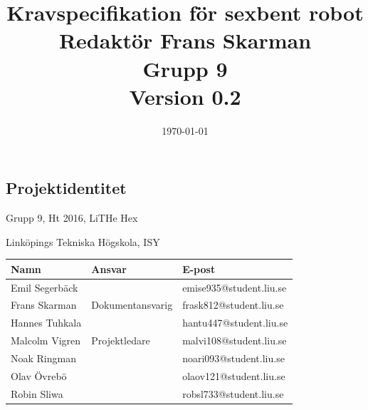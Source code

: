 \documentclass[a4paper,titlepage,12pt]{article}
\begin{document}
    \title{\LARGE
        \textbf{Kravspecifikation för sexbent robot} \\
        \vspace*{0.5\baselineskip}
        \large
        Redaktör Frans Skarman \\
        Grupp 9 \\
        \small
        \vspace*{0.5\baselineskip}
        Version 0.2}

    \date{\today}

	\maketitle
	\newpage

	
	\begin{center}


		\section*{Projektidentitet}
		Grupp 9, Ht 2016, LiTHe Hex

		Linköpings Tekniska Högskola, ISY

		\begin{table}[h]
			\begin{center}
				\begin{tabular}[pos]{ l l l }
					\textbf{Namn} & \textbf{Ansvar} & \textbf{E-post} \\ \midrule
					Emil Segerbäck & & emise935@student.liu.se \\ \midrule
					Frans Skarman & Dokumentansvarig & frask812@student.liu.se \\ \midrule
					Hannes Tuhkala & & hantu447@student.liu.se \\ \midrule
					Malcolm Vigren & Projektledare & malvi108@student.liu.se \\ \midrule
					Noak Ringman &  & noari093@student.liu.se \\ \midrule
					Olav Övrebö &  & olaov121@student.liu.se \\ \midrule
					Robin Sliwa &  & robsl733@student.liu.se \\
				\end{tabular}
			\end{center}
		\end{table}


\end{center}
\end{document}
